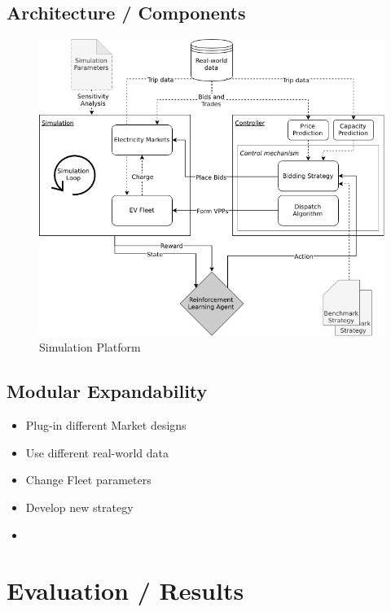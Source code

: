 \documentclass[a4paper, 12pt]{article}
\begin{document}
\subsection{Architecture / Components}
\label{sec:orgecd88dd}
\begin{figure}[htbp]
\centering
\includegraphics[width=1\linewidth]{./fig/simulation_platform.png}
\caption[Simulation Platform]{Simulation Platform \label{fig-simulation-platform}}
\end{figure}

\subsection{Modular Expandability}
\label{sec:org082e4b6}
\begin{itemize}
\item Plug-in different Market designs
\item Use different real-world data
\item Change Fleet parameters
\item Develop new strategy
\item
\end{itemize}

\clearpage
\section{Evaluation / Results}
\label{sec:org2e2df79}
\end{document}
